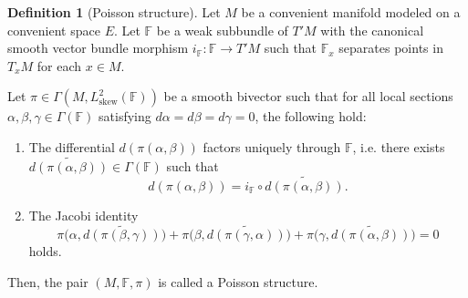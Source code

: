 \documentclass[11pt,reqno]{amsart}
\theoremstyle{definition}
\newtheorem{definition}[theorem]{Definition}
\numberwithin{equation}{section}
\begin{document}
\begin{definition}[Poisson structure]\label{3.2}
Let $M$ be a convenient manifold modeled on a convenient space $E$. Let $\mathbb{F}$ be a weak  subbundle of $T'M$ with the canonical smooth vector bundle morphism $i_{\mathbb F}: \mathbb F\to T'M$ such that $\mathbb F_x$ separates points in $T_xM$ for each $x\in M$.

Let $\pi \in \Gamma(M, L_{\text{skew}}^{2}(\mathbb{F}))$ be a smooth bivector  such that for all local sections $\alpha,\beta,\gamma\in\Gamma(\mathbb F)$
satisfying $d\alpha=d\beta=d\gamma=0$, the following hold:
\begin{enumerate}
 \item The differential
$d(\pi(\alpha,\beta))$ factors uniquely through $\mathbb F$, i.e.
there exists $\widetilde{d(\pi(\alpha,\beta))}\in\Gamma(\mathbb F)$
such that
\[
d(\pi(\alpha,\beta))
=
i_{\mathbb F}\circ
\widetilde{d(\pi(\alpha,\beta))}.
\]
  \item The Jacobi identity
\[
\pi\big(\alpha,\widetilde{d(\pi(\beta,\gamma))}\big)
+
\pi\big(\beta,\widetilde{d(\pi(\gamma,\alpha))}\big)
+
\pi\big(\gamma,\widetilde{d(\pi(\alpha,\beta))}\big)
= 0
\]
holds.
\end{enumerate}
Then, the pair $(M, \mathbb{F}, \pi)$ is called a Poisson structure. 
\end{definition}
\end{document}
